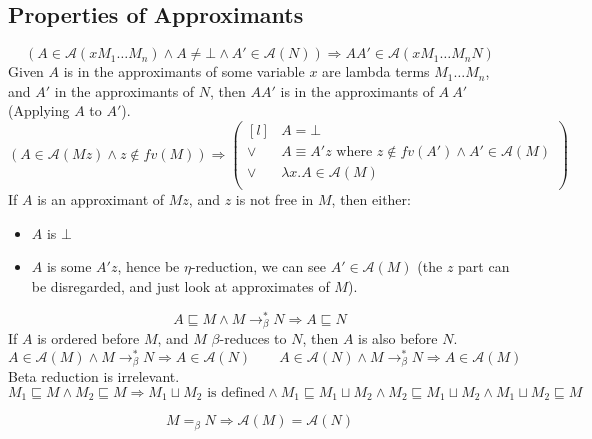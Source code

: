 \subsection{Properties of Approximants}
\[(A \in \mathcal{A}(xM_1\dots M_n) \land A \neq \bot \land A' \in \mathcal{A}(N) ) \Rightarrow A A' \in \mathcal{A}(x M_1 \dots M_n N)\]
Given $A$ is in the approximants of some variable $x$ are lambda terms $M_1 \dots M_n$, and $A'$ in the approximants of $N$, then $A A'$ is in the approximants of $A \ A'$ (Applying $A$ to $A'$).
\vspace{5mm}
\[(A \in \mathcal{A}(Mz) \land z \not\in fv(M) ) \Rightarrow \left( \begin{matrix*}[l]
    & A = \bot \\
    \lor & A \equiv A'z \text{ where } z \not\in fv(A') \land A' \in \mathcal{A}(M) \\
    \lor & \lambda x. A \in \mathcal{A}(M) \\
\end{matrix*} \right)\]
If $A$ is an approximant of $Mz$, and $z$ is not free in $M$, then either:
\begin{itemize}
    \item $A$ is $\bot$
    \item $A$ is some $A'z$, hence be $\eta$-reduction, we can see $A' \in \mathcal{A}(M)$ (the $z$ part can be disregarded, and just look at approximates of $M$).
\end{itemize}
\vspace{5mm}
\[A \sqsubseteq M \land M \to^*_\beta N \Rightarrow A \sqsubseteq N\]
If $A$ is ordered before $M$, and $M$ $\beta$-reduces to $N$, then $A$ is also before $N$.
\vspace{5mm}
\[A \in \mathcal{A}(M) \land M \to^*_\beta N \Rightarrow A \in \mathcal{A}(N) \qquad A \in \mathcal{A}(N) \land M \to^*_\beta N \Rightarrow A \in \mathcal{A}(M)\]
Beta reduction is irrelevant.
\[M_1 \sqsubseteq M \land M_2 \sqsubseteq M \Rightarrow M_1 \sqcup M_2 \text{ is defined} \land M_1 \sqsubseteq M_1 \sqcup M_2 \land M_2 \sqsubseteq M_1 \sqcup M_2 \land M_1 \sqcup M_2 \sqsubseteq M \]

\[M =_\beta N \Rightarrow \mathcal{A}(M) = \mathcal{A}(N)\]


